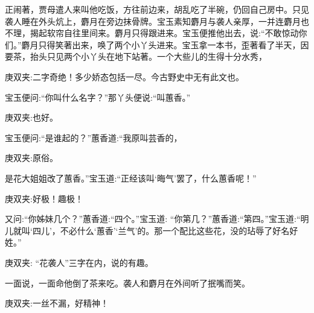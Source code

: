 \begin{parag}
    正闹著，贾母遣人来叫他吃饭，方往前边来，胡乱吃了半碗，仍回自己房中。只见袭人睡在外头炕上，麝月在旁边抹骨牌。宝玉素知麝月与袭人亲厚，一并连麝月也不理，揭起软帘自往里间来。麝月只得跟进来。宝玉便推他出去，说:“不敢惊动你们。”麝月只得笑著出来，唤了两个小丫头进来。宝玉拿一本书，歪著看了半天，因要茶，抬头只见两个小丫头在地下站著。一个大些儿的生得十分水秀，\begin{note}庚双夹:二字奇绝！多少娇态包括一尽。今古野史中无有此文也。\end{note}宝玉便问:“你叫什么名字？”那丫头便说:“叫蕙香。”\begin{note}庚双夹:也好。\end{note}宝玉便问:“是谁起的？”蕙香道:“我原叫芸香的，\begin{note}庚双夹:原俗。\end{note}是花大姐姐改了蕙香。”宝玉道:“正经该叫‘晦气’罢了，什么蕙香呢！”\begin{note}庚双夹:好极！趣极！\end{note}又问:“你姊妹几个？”蕙香道:“四个。”宝玉道: “你第几？”蕙香道:“第四。”宝玉道:“明儿就叫‘四儿’，不必什么‘蕙香’‘兰气’的。那一个配比这些花，没的玷辱了好名好姓。”\begin{note}庚双夹: “花袭人”三字在内，说的有趣。\end{note}一面说，一面命他倒了茶来吃。袭人和麝月在外间听了抿嘴而笑。\begin{note}庚双夹:一丝不漏，好精神！\end{note}
\end{parag}


